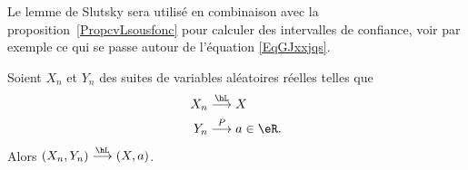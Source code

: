 Le lemme de Slutsky sera utilisé en combinaison avec la proposition~\ref{PropcvLsousfonc} pour calculer des intervalles de confiance, voir par exemple ce qui se passe autour de l'équation \eqref{EqGJxxjqs}.
\begin{lemma}  \label{LemgXDlhs}
	Soient \( X_n\) et \( Y_n\) des suites de variables aléatoires réelles telles que
	\begin{equation}
		\begin{aligned}[]
			X_n & \stackrel{\hL}{\longrightarrow} X     \\
			Y_n & \stackrel{P}{\longrightarrow}a\in\eR.
		\end{aligned}
	\end{equation}
	Alors \( (X_n,Y_n)\stackrel{\hL}{\longrightarrow}(X,a)\).
\end{lemma}

